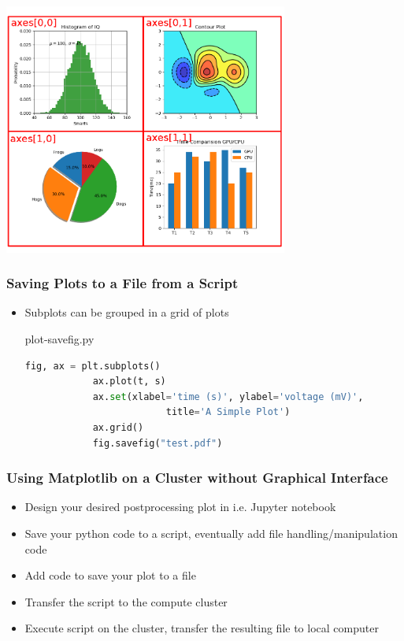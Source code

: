 \begin{frame}[fragile]
   \vspace{-1cm}
    \begin{center}
      \includegraphics[width=0.7\textwidth]{screenshots/plt-8.png}
    \end{center}						
\end{frame}

\begin{frame}[fragile]
	\frametitle{Saving Plots to a File from a Script}
    \begin{itemize}
      \item Subplots can be grouped in a grid of plots			
    \begin{block}{plot-savefig.py}
    \begin{lstlisting}[language=Python]			
			fig, ax = plt.subplots()			
			ax.plot(t, s)
			ax.set(xlabel='time (s)', ylabel='voltage (mV)',
						 title='A Simple Plot')
			ax.grid()
			fig.savefig("test.pdf")			
    \end{lstlisting}      
		\end{block}						
    \end{itemize}					
\end{frame}

\begin{frame}[fragile]
	\frametitle{Using Matplotlib on a Cluster without Graphical Interface}
    \begin{itemize}
      \item Design your desired postprocessing plot in i.e. Jupyter notebook
      \item Save your python code to a script, eventually add file handling/manipulation code			
      \item Add code to save your plot to a file				
      \item Transfer the script to the compute cluster						
      \item Execute script on the cluster, transfer the resulting file to local computer									
    \end{itemize}					
\end{frame}